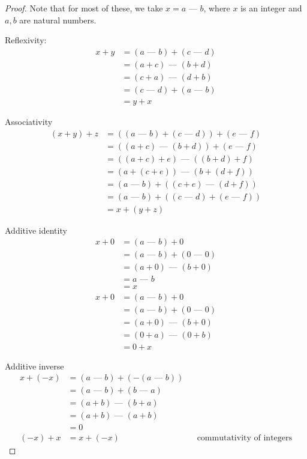 \documentclass[answers,12pt]{exam}
\newcommand{\fakeminus}{\text{ --- }}
\begin{document}
\begin{solution}
\begin{proof}
    Note that for most of these, we take $x = a \fakeminus b$, where $x$ is an integer and $a,b$ are natural numbers.

    Reflexivity:
    \begin{align*}
        x+y &= (a \fakeminus b) + (c \fakeminus d) \\
        &= (a+c) \fakeminus (b+d) \\
        &= (c+a) \fakeminus (d+b) \\
        &= (c \fakeminus d) + (a \fakeminus b) \\
        &= y+x
    \end{align*}

    Associativity
    \begin{align*}
        (x+y)+z &= ((a \fakeminus b) + (c \fakeminus d)) + (e \fakeminus f) \\
        &= ((a+c) \fakeminus (b+d)) + (e \fakeminus f) \\
        &= ((a+c)+e) \fakeminus ((b+d)+f) \\
        &= (a+(c+e)) \fakeminus (b+(d+f)) \\
        &= (a \fakeminus b) + ((c+e) \fakeminus (d+f)) \\
        &= (a \fakeminus b) + ((c \fakeminus d) + (e \fakeminus f)) \\
        &= x + (y+z)
    \end{align*}

    Additive identity
    \begin{align*}
        x+0 &= (a \fakeminus b) + 0 \\
        &= (a \fakeminus b) + (0 \fakeminus 0) \\
        &= (a+0) \fakeminus (b+0) \\
        &= a \fakeminus b \\
        &= x
    \end{align*}
    \begin{align*}
        x+0 &= (a \fakeminus b) + 0 \\
        &= (a \fakeminus b) + (0 \fakeminus 0) \\
        &= (a+0) \fakeminus (b+0) \\
        &= (0+a) \fakeminus (0+b) \\
        &= 0 + x
    \end{align*}

    Additive inverse
    \begin{align*}
        x + (-x) &= (a \fakeminus b) + (- (a \fakeminus b)) \\
        &= (a \fakeminus b) + (b \fakeminus a) \\
        &= (a+b) \fakeminus (b+a) \\
        &= (a+b) \fakeminus (a+b) \\ 
        &= 0 \\
        (-x)+x &= x + (-x) && \text{commutativity of integers}
    \end{align*}


\end{proof}
\end{solution}
\end{document}
